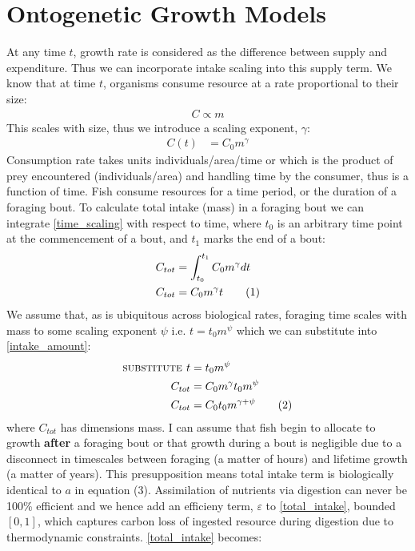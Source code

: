 \documentclass[a4paper]{article} %
\newcommand\numberthis{\addtocounter{equation}{1}\tag{\theequation}}
\begin{document}
\section{Ontogenetic Growth Models}
At any time $t$, growth rate is considered as the difference between supply and expenditure. Thus we can incorporate intake scaling into this supply term.
We know that at time $t$, organisms consume resource at a rate proportional to their size:
\begin{align*}
    C \propto m
\end{align*}
This scales with size, thus we introduce a scaling exponent, $\gamma$:
\begin{align}
    C(t) &= C_{0}m^{\gamma} \label{time_scaling}
\end{align}
Consumption rate takes units individuals/area/time or which is the product of prey encountered (individuals/area) and handling time by the consumer, thus is a function of time. Fish consume resources for a time period, or the duration of a foraging bout. To calculate total intake (mass) in a foraging bout we can integrate \eqref{time_scaling} with respect to time, where $t_0$ is an arbitrary time point at the commencement of a bout, and $t_1$ marks the end of a bout:
\begin{align*}
    C_{tot} &= \int_{t_{0}}^{t_{1}}C_{0}m^{\gamma}dt \\
    C_{tot} &= C_{0}m^{\gamma}t \numberthis \label{intake_amount}
\end{align*}
We assume that, as is ubiquitous across biological rates, foraging time scales with mass to some scaling exponent $\psi$ i.e. $t = t_{0}m^{\psi}$ which we can substitute into \eqref{intake_amount}:
\begin{align*}
    \textsc{substitute } t &= t_{0}m^{\psi} \\
    C_{tot} &= C_{0}m^{\gamma}t_{0}m^{\psi} \\
    C_{tot} &= C_{0}t_{0}m^{\gamma + \psi} \numberthis \label{total_intake}
\end{align*}
where $C_{tot}$ has dimensions mass. I can assume that fish begin to allocate to growth \textbf{after} a foraging bout or that growth during a bout is negligible due to a disconnect in timescales between foraging (a matter of hours) and lifetime growth (a matter of years). This presupposition means total intake term is biologically identical to $a$ in equation (3). Assimilation of nutrients via digestion can never be 100\% efficient and we hence add an efficieny term, $\varepsilon$ to \eqref{total_intake}, bounded $[0,1]$, which captures carbon loss of ingested resource during digestion due to thermodynamic constraints. \eqref{total_intake} becomes:
\end{document}
